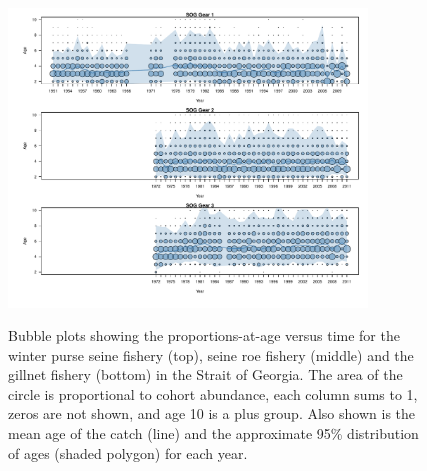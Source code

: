 \begin{figure}
	\centering
	\includegraphics[width=0.85\textwidth]{../Figs/iscam_fig_AgeCompsSOG.pdf}\\
	\caption{Bubble plots showing the proportions-at-age versus time for the winter purse seine fishery (top), seine roe fishery (middle) and the gillnet fishery (bottom) in the Strait of Georgia.  The area of the circle is proportional to cohort abundance, each column sums to 1, zeros are not shown, and age 10 is a plus group. Also shown is the mean age of the catch (line) and the approximate 95\% distribution of ages (shaded polygon) for each year.}\label{FigAgeCompsSOG}
\end{figure}


